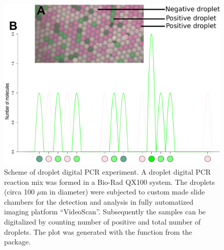 \begin{figure}[htbp]
  \centering
  \includegraphics[clip=true, width=14cm]{figures/dpcR_sim.pdf}
  \caption{Scheme of droplet digital PCR experiment.  A droplet 
digital PCR reaction mix was formed in a Bio-Rad QX100 system. The droplets 
(circa 100 $\mu$m in diameter) were subjected to custom made slide chambers for the 
detection and analysis in fully automatized imaging platform ``VideoScan''. 
 Subsequently the samples can be digitalized by counting number of 
positive and total number of droplets. The plot was generated with the 
 function from the  package.}
\label{figure:dpcR_sim}
\end{figure}

